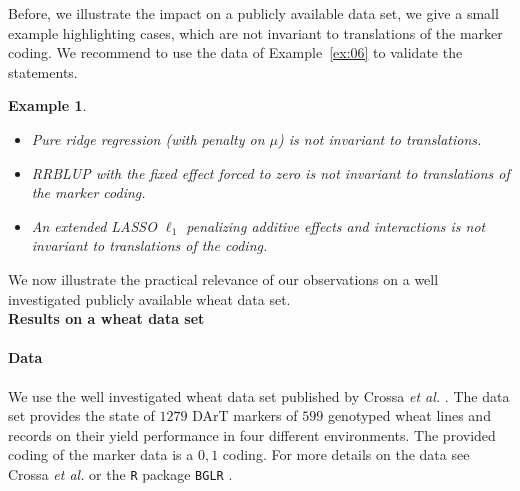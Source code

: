 \documentclass{bmcart}
\newtheorem{example}{Example}
\newcommand{\0}{\mathbf{0}}
\begin{document}
Before, we illustrate the impact on a publicly available data set, we give a small example highlighting cases, which are not invariant to translations of the marker coding.
We recommend to use the data of Example~\ref{ex:06} to validate the statements.

\begin{example}~\\
	\begin{itemize} \item[a)] Pure ridge regression (with penalty on $\mu$) is not invariant to translations. 
		\item[b)] RRBLUP with the fixed effect forced to zero is not invariant to translations of the marker coding.
				\item[c)] An extended LASSO $\ell_1$ penalizing additive effects and interactions is not invariant to translations of the coding.
	\end{itemize}
\end{example} We now illustrate the practical relevance of our observations on a well investigated publicly available wheat data set. \vspace{0.4cm}\\
{\bf Results on a wheat data set}\\

  
\paragraph{Data} We use the well investigated wheat data set published by Crossa {\it et al.} \cite{Crossa10}. The data set provides the state of $1279$ DArT markers of $599$ genotyped wheat lines and records on their yield performance in four different environments. The provided coding of the marker data is a $0,1$ coding. For more details on the data see Crossa {\it et al.} \cite{Crossa10} or the \texttt{R} \cite{RCoreTeam2016R:Computing} package \texttt{BGLR} \cite{BGLR}. \\
\end{document}
